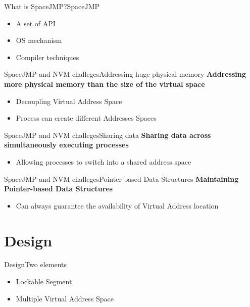 \documentclass[10pt]{beamer}
\begin{document}
\begin{frame}{What is SpaceJMP?}{SpaceJMP}
  \begin{itemize}
    \item A set of API \pause
    \item OS mechanism \pause
    \item Compiler techniques
  \end{itemize}
\end{frame}

\begin{frame}{SpaceJMP and NVM challeges}{Addressing huge physical memory}
  \textbf{Addressing more physical memory than the size of the virtual space}
  \pause
  \begin{itemize}
    \item Decoupling Virtual Address Space \pause
    \item Process can create different Addresses Spaces
  \end{itemize}
\end{frame}

\begin{frame}{SpaceJMP and NVM challeges}{Sharing data}
  \textbf{Sharing data across simultaneously executing processes}
  \pause
  \begin{itemize}
    \item Allowing processes to switch into a shared address space
  \end{itemize}
\end{frame}

\begin{frame}{SpaceJMP and NVM challeges}{Pointer-based Data Structures}
  \textbf{Maintaining Pointer-based Data Structures} \pause
  \begin{itemize}
    \item Can always guarantee the availability of Virtual Address location
  \end{itemize}
\end{frame}

\section{Design}

\begin{frame}{Design}{Two elements}
  \begin{itemize}
    \item Lockable Segment
    \item Multiple Virtual Address Space
  \end{itemize}
\end{frame}
\end{document}
